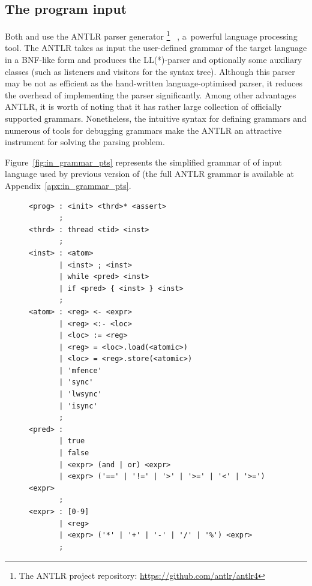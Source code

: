 \subsection{The program input}
\label{ch:impl:input}

Both \porthos[1] and \porthos[2] use the ANTLR parser generator%
\footnote{The ANTLR project repository: \url{https://github.com/antlr/antlr4}}%
~\cite{parr2013definitive}, a~powerful language processing tool.
The ANTLR takes as input the user-defined grammar of the target language in a BNF-like form and produces the LL(*)-parser and optionally some auxiliary classes (such as listeners and visitors for the syntax tree).
Although this parser may be not as efficient as the hand-written language-optimised parser, it reduces the overhead of implementing the parser significantly.
Among other advantages ANTLR, it is worth of noting that it has rather large collection of officially supported grammars. Nonetheless, the intuitive syntax for defining grammars and numerous of tools for debugging grammars make the ANTLR an attractive instrument for solving the parsing problem.

Figure~\ref{fig:in_grammar_pts} represents the simplified grammar of of input language used by previous version of \porthos{} (the full ANTLR grammar is available at Appendix~\ref{apx:in_grammar_pts}.

\begin{figure}[H]
\begin{lstlisting}[mathescape=true,%
                  caption={The sketch of the input language grammar used by \oldporthos},%
                  label={fig:in_grammar_pts},%
                  morekeywords={if,then,else,return,while,program,thread},%
                  breaklines=true,%
                  basicstyle=\ttfamily\scriptsize]
<prog> : <init> <thrd>* <assert>
       ;
<thrd> : thread <tid> <inst>
       ;
<inst> : <atom>
       | <inst> ; <inst>
       | while <pred> <inst>
       | if <pred> { <inst> } <inst>
       ;
<atom> : <reg> <- <expr>
       | <reg> <:- <loc>
       | <loc> := <reg>
       | <reg> = <loc>.load(<atomic>)
       | <loc> = <reg>.store(<atomic>)
       | 'mfence'
       | 'sync'
       | 'lwsync'
       | 'isync'
       ;
<pred> :
       | true
       | false
       | <expr> (and | or) <expr>
       | <expr> ('==' | '!=' | '>' | '>=' | '<' | '>=') <expr>
       ;
<expr> : [0-9]
       | <reg>
       | <expr> ('*' | '+' | '-' | '/' | '%') <expr>
       ;
\end{lstlisting}
\end{figure}

